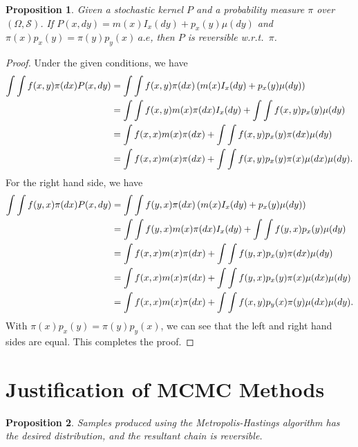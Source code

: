 \documentclass[a4paper,11pt]{article}
\newtheorem{proposition}{Proposition}
\newcommand{\sset}{\mathcal{S}}
\begin{document}
\begin{proposition} \label{prop:r2}
    Given a stochastic kernel $P$ and a probability measure $\pi$ over $(\Omega, \sset)$. If $P(x, dy) = m(x) I_x(dy) + p_x(y) \mu(dy)$ and $\pi(x) p_x(y) = \pi(y) p_y(x) \ a.e$, then
    $P$ is reversible \textit{w.r.t.}~$\pi$.
\end{proposition}

\begin{proof}
    Under the given conditions, we have
    \begin{align}
        \int \int f(x, y) \pi(dx) P(x, dy)
        &= \int \int f(x, y) \pi(dx) \left(m(x) I_x(dy) + p_x(y) \mu(dy) \right) \notag \\
        &= \int \int f(x, y) m(x) \pi(dx) I_x(dy) + \int \int f(x, y) p_x(y) \mu(dy) \notag \\
        &= \int f(x, x) m(x) \pi(dx) + \int \int f(x, y) p_x(y) \pi(dx) \mu(dy) \notag \\
        &= \int f(x, x) m(x) \pi(dx) + \int \int f(x, y) p_x(y) \pi(x) \mu(dx) \mu(dy).
    \end{align}
    For the right hand side, we have
    \begin{align}
        \int \int f(y, x) \pi(dx) P(x, dy)
        &= \int \int f(y, x) \pi(dx) \left(m(x) I_x(dy) + p_x(y) \mu(dy) \right) \notag \\
        &= \int \int f(y, x) m(x) \pi(dx) I_x(dy) + \int \int f(y, x) p_x(y) \mu(dy) \notag \\
        &= \int f(x, x) m(x) \pi(dx) + \int \int f(y, x) p_x(y) \pi(dx) \mu(dy) \notag \\
        &= \int f(x, x) m(x) \pi(dx) + \int \int f(y, x) p_x(y) \pi(x) \mu(dx) \mu(dy) \notag \\
        &= \int f(x, x) m(x) \pi(dx) + \int \int f(x, y) p_y(x) \pi(y) \mu(dx) \mu(dy).       
    \end{align}
    With $\pi(x) p_x(y) = \pi(y) p_y(x)$, we can see that the left and right hand sides are equal. This completes the proof.
\end{proof}



\section{Justification of MCMC Methods}

\begin{proposition}
    Samples produced using the Metropolis-Hastings algorithm has the desired distribution, and the resultant chain is reversible.
\end{proposition}
\end{document}
